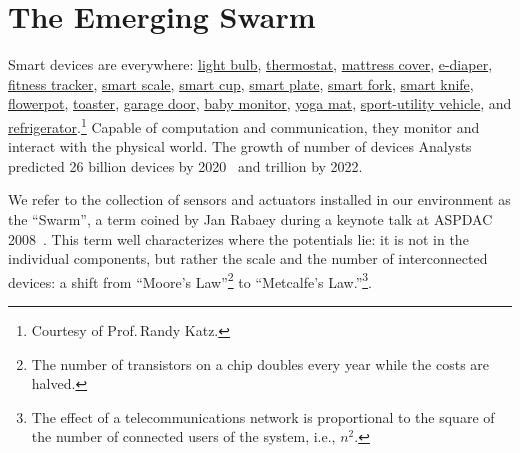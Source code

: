 \section{The Emerging Swarm}
\label{sec:emerging-swarm}

Smart devices are everywhere: \href{http://ilumi.co/}{light bulb},
\href{https://nest.com/}{thermostat}, \href{http://lunasleep.com/}{mattress
  cover}, \href{https://www.indiegogo.com/projects/smart-diapers}{e-diaper},
\href{https://www.fitbit.com/}{fitness tracker},
\href{https://www.fitbit.com/aria}{smart scale},
\href{https://www.myvessyl.com/}{smart cup},
\href{https://www.kickstarter.com/projects/1816678675/smartplate-instantly-track-and-analyze-everything}{smart
  plate},
\href{http://www.amazon.com/HAPILABS-102-HAPIfork-Bluetooth-Enabled-Smart/dp/B00FRPCPEC}{smart
  fork}, \href{http://electroluxdesignlab.com/en/submission/smart-knife/}{smart
  knife},
\href{http://www.clickandgrow.com/pages/what-is-click-grow}{flowerpot},
\href{http://www.williams-sonoma.com/products/breville-die-cast-2-slice-stainless-steel-smart-toaster/}{toaster},
\href{https://garageio.com/}{garage door},
\href{http://www2.withings.com/us/en/products/baby/smart-baby-monitor}{baby
  monitor},
\href{https://www.indiegogo.com/projects/smartmat-the-world-s-first-intelligent-yoga-mat}{yoga
  mat},
\href{http://usnews.rankingsandreviews.com/cars-trucks/best-cars-blog/2013/02/2015_GM_Vehicles_Will_Get_Wi-Fi_Internet_Access/}{sport-utility
  vehicle}, and
\href{http://www.samsung.com/us/appliances/refrigerators/RF28HMELBSR/AA}{refrigerator}.\footnote{Courtesy
  of Prof.\,Randy Katz.} Capable of computation and communication, they monitor
and interact with the physical world.  The growth of number of devices Analysts
predicted 26 billion devices by 2020~\cite{middleton2013forecast} and trillion
by 2022.


We refer to the collection of sensors and actuators installed in our environment
as the ``Swarm'', a term coined by Jan Rabaey during a keynote talk at ASPDAC
2008~\cite{rabaey2008brand}. This term well characterizes where the potentials
lie: it is not in the individual components, but rather the scale and the number
of interconnected devices: a shift from ``Moore's Law''\footnote{The number of
  transistors on a chip doubles every year while the costs are halved.} to
``Metcalfe's Law.''\footnote{The effect of a telecommunications network is
  proportional to the square of the number of connected users of the system,
  i.e., $n^2$.}.

